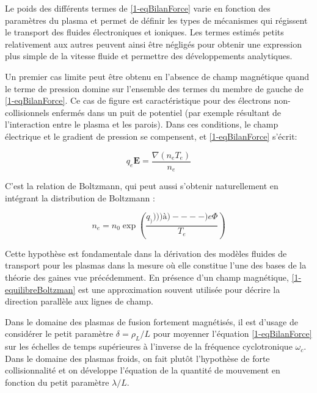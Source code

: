 \begin{refsection}
Le poids des différents termes de \eqref{1-eqBilanForce} varie en fonction des
paramètres du plasma et permet de définir les types de mécanismes qui régissent
le transport des fluides électroniques et ioniques. Les termes estimés petits
relativement aux autres peuvent ainsi être négligés pour obtenir une
expression plus simple de la vitesse fluide et permettre des développements
analytiques.

Un premier cas limite peut être obtenu en l'absence de champ magnétique quand
le terme de pression domine sur l'ensemble des termes du membre de gauche de
\eqref{1-eqBilanForce}. Ce cas de figure est caractéristique pour des électrons
non-collisionnels enfermés dans un puit de potentiel (par exemple résultant de
l'interaction entre le plasma et les parois). Dans ces conditions, le champ électrique et le gradient
de pression se compensent, et \eqref{1-eqBilanForce} s'écrit:

\begin{equation}
\label{1-equilibreBoltzman}
q_e\mathbf
E =\frac{\nabla (n_e T_e)}{n_e}
\end{equation}

C'est la relation de Boltzmann, qui peut aussi s'obtenir naturellement en
intégrant la distribution de Boltzmann :

\begin{equation}
\label{1-profilBoltzman}
n_e=n_0\exp(\frac{q_))))à)----) e\Phi}{T_e})
\end{equation}

Cette hypothèse est fondamentale dans la dérivation des modèles fluides
de transport pour les plasmas dans la mesure où elle constitue l'une des bases
de la théorie des gaines vue précédemment.
En présence d'un champ magnétique,
\eqref{1-equilibreBoltzman} est une approximation souvent utilisée pour
décrire la direction parallèle aux lignes de champ. 

Dans le domaine des plasmas de fusion fortement magnétisés, il est
d'usage de considérer le petit paramètre $\delta=\rho_L/L$ pour moyenner
l'équation \eqref{1-eqBilanForce} sur les échelles de temps supérieures à
l'inverse de la fréquence cyclotronique $\omega_{c}$.
Dans le domaine des plasmas
froids, on fait plutôt l'hypothèse de forte collisionnalité et on développe
l'équation de la quantité de mouvement en fonction du petit paramètre
$\lambda/L$.


\end{refsection}
